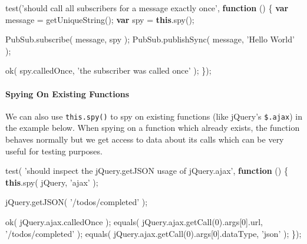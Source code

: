 \documentclass[9pt]{book}
\newenvironment{Shaded}{}{}
\newcommand{\KeywordTok}[1]{\textcolor[rgb]{0.00,0.44,0.13}{\textbf{{#1}}}}
\newcommand{\DecValTok}[1]{\textcolor[rgb]{0.25,0.63,0.44}{{#1}}}
\newcommand{\StringTok}[1]{\textcolor[rgb]{0.25,0.44,0.63}{{#1}}}
\newcommand{\OtherTok}[1]{\textcolor[rgb]{0.00,0.44,0.13}{{#1}}}
\newcommand{\FunctionTok}[1]{\textcolor[rgb]{0.02,0.16,0.49}{{#1}}}
\newcommand{\NormalTok}[1]{{#1}}
\begin{document}
\begin{Shaded}
\begin{Highlighting}[]
\FunctionTok{test}\NormalTok{(}\StringTok{'should call all subscribers for a message exactly once'}\NormalTok{, }\KeywordTok{function} \NormalTok{() \{}
    \KeywordTok{var} \NormalTok{message = }\FunctionTok{getUniqueString}\NormalTok{();}
    \KeywordTok{var} \NormalTok{spy = }\KeywordTok{this}\NormalTok{.}\FunctionTok{spy}\NormalTok{();}

    \OtherTok{PubSub}\NormalTok{.}\FunctionTok{subscribe}\NormalTok{( message, spy );}
    \OtherTok{PubSub}\NormalTok{.}\FunctionTok{publishSync}\NormalTok{( message, }\StringTok{'Hello World'} \NormalTok{);}

    \FunctionTok{ok}\NormalTok{( }\OtherTok{spy}\NormalTok{.}\FunctionTok{calledOnce}\NormalTok{, }\StringTok{'the subscriber was called once'} \NormalTok{);}
\NormalTok{\});}
\end{Highlighting}
\end{Shaded}

\paragraph{Spying On Existing
Functions}\label{spying-on-existing-functions}

We can also use \texttt{this.spy()} to spy on existing functions (like
jQuery's \texttt{\$.ajax}) in the example below. When spying on a
function which already exists, the function behaves normally but we get
access to data about its calls which can be very useful for testing
purposes.

\begin{Shaded}
\begin{Highlighting}[]
\FunctionTok{test}\NormalTok{( }\StringTok{'should inspect the jQuery.getJSON usage of jQuery.ajax'}\NormalTok{, }\KeywordTok{function} \NormalTok{() \{}
    \KeywordTok{this}\NormalTok{.}\FunctionTok{spy}\NormalTok{( jQuery, }\StringTok{'ajax'} \NormalTok{);}

    \OtherTok{jQuery}\NormalTok{.}\FunctionTok{getJSON}\NormalTok{( }\StringTok{'/todos/completed'} \NormalTok{);}

    \FunctionTok{ok}\NormalTok{( }\OtherTok{jQuery}\NormalTok{.}\OtherTok{ajax}\NormalTok{.}\FunctionTok{calledOnce} \NormalTok{);}
    \FunctionTok{equals}\NormalTok{( }\OtherTok{jQuery}\NormalTok{.}\OtherTok{ajax}\NormalTok{.}\FunctionTok{getCall}\NormalTok{(}\DecValTok{0}\NormalTok{).}\FunctionTok{args}\NormalTok{[}\DecValTok{0}\NormalTok{].}\FunctionTok{url}\NormalTok{, }\StringTok{'/todos/completed'} \NormalTok{);}
    \FunctionTok{equals}\NormalTok{( }\OtherTok{jQuery}\NormalTok{.}\OtherTok{ajax}\NormalTok{.}\FunctionTok{getCall}\NormalTok{(}\DecValTok{0}\NormalTok{).}\FunctionTok{args}\NormalTok{[}\DecValTok{0}\NormalTok{].}\FunctionTok{dataType}\NormalTok{, }\StringTok{'json'} \NormalTok{);}
\NormalTok{\});}
\end{Highlighting}
\end{Shaded}
\end{document}
